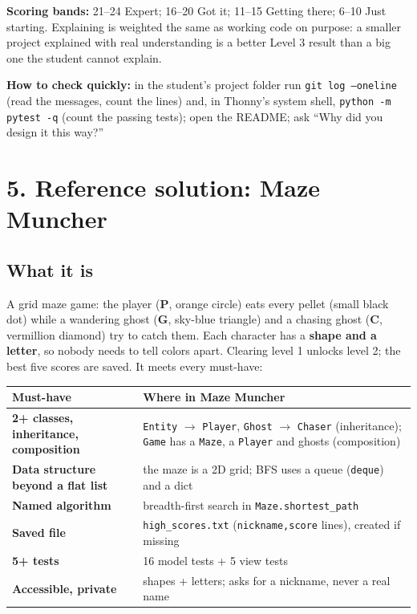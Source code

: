 \documentclass[level=3,teacher]{kidscode}
\begin{document}
\textbf{Scoring bands:} 21--24 Expert; 16--20 Got it; 11--15 Getting there; 6--10 Just
starting. Explaining is weighted the same as working code on purpose: a smaller project explained
with real understanding is a better Level 3 result than a big one the student cannot explain.

\textbf{How to check quickly:} in the student's project folder run \texttt{git log --oneline} (read
the messages, count the lines) and, in Thonny's system shell, \texttt{python -m pytest -q} (count
the passing tests); open
the README; ask \enquote{Why did you design it this way?}

\section{5. Reference solution: Maze Muncher}

\subsection{What it is}
A grid maze game: the player (\textbf{P}, orange circle) eats every pellet (small black dot) while
a wandering ghost (\textbf{G}, sky-blue triangle) and a chasing ghost (\textbf{C}, vermillion
diamond) try to catch them. Each character has a \textbf{shape and a letter}, so nobody needs to
tell colors apart. Clearing level 1 unlocks level 2; the best five scores are saved. It meets
every must-have:

\begin{tabularx}{\linewidth}{@{}>{\bfseries}p{4.2cm}X@{}}
\toprule
Must-have & Where in Maze Muncher\\ \midrule
2+ classes, inheritance, composition & \texttt{Entity} $\rightarrow$ \texttt{Player}, \texttt{Ghost} $\rightarrow$ \texttt{Chaser}
(inheritance); \texttt{Game} has a \texttt{Maze}, a \texttt{Player} and ghosts (composition)\\
Data structure beyond a flat list & the maze is a 2D grid; BFS uses a queue (\texttt{deque}) and a dict\\
Named algorithm & breadth-first search in \texttt{Maze.shortest\_path}\\
Saved file & \texttt{high\_scores.txt} (\texttt{nickname,score} lines), created if missing\\
5+ tests & 16 model tests + 5 view tests\\
Accessible, private & shapes + letters; asks for a nickname, never a real name\\
\bottomrule
\end{tabularx}
\end{document}
